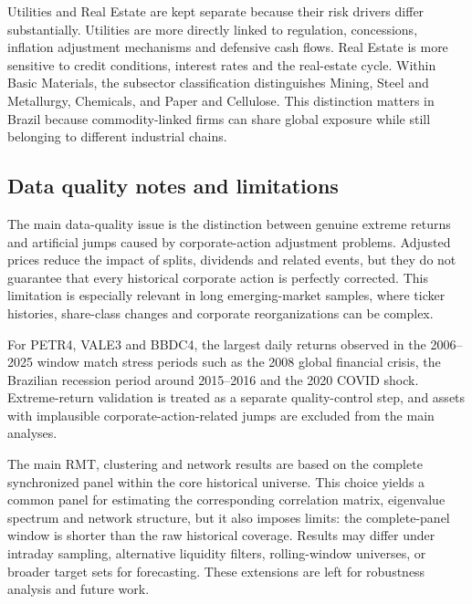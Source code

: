 Utilities and Real Estate are kept separate because their risk drivers differ substantially. Utilities are more directly linked to regulation, concessions, inflation adjustment mechanisms and defensive cash flows. Real Estate is more sensitive to credit conditions, interest rates and the real-estate cycle. Within Basic Materials, the subsector classification distinguishes Mining, Steel and Metallurgy, Chemicals, and Paper and Cellulose. This distinction matters in Brazil because commodity-linked firms can share global exposure while still belonging to different industrial chains.

\subsection{Data quality notes and limitations}

The main data-quality issue is the distinction between genuine extreme returns and artificial jumps caused by corporate-action adjustment problems. Adjusted prices reduce the impact of splits, dividends and related events, but they do not guarantee that every historical corporate action is perfectly corrected. This limitation is especially relevant in long emerging-market samples, where ticker histories, share-class changes and corporate reorganizations can be complex.

For PETR4, VALE3 and BBDC4, the largest daily returns observed in the 2006--2025 window match stress periods such as the 2008 global financial crisis, the Brazilian recession period around 2015--2016 and the 2020 COVID shock. Extreme-return validation is treated as a separate quality-control step, and assets with implausible corporate-action-related jumps are excluded from the main analyses.

The main RMT, clustering and network results are based on the complete synchronized panel within the core historical universe. This choice yields a common panel for estimating the corresponding correlation matrix, eigenvalue spectrum and network structure, but it also imposes limits: the complete-panel window is shorter than the raw historical coverage. Results may differ under intraday sampling, alternative liquidity filters, rolling-window universes, or broader target sets for forecasting. These extensions are left for robustness analysis and future work.
